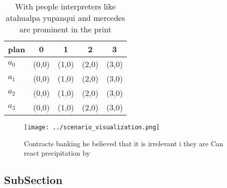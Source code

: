 \documentclass[a4paper]{article}
\begin{document}
\begin{table}
\begin{adjustbox}{width=1\columnwidth}
\begin{tabular}{|l|l|l|l|l|}
\hline
\textbf{plan} & \multicolumn{1}{c|}{\textbf{0}} & \multicolumn{1}{c|}{\textbf{1}} & \multicolumn{1}{c|}{\textbf{2}} & \multicolumn{1}{c|}{\textbf{3}} \\ \hline
\textbf{$a_0$}  & (0,0) & (1,0) & (2,0) & (3,0) \\ \hline
\textbf{$a_1$}  & (0,0) & (1,0) & (2,0) & (3,0) \\ \hline
\textbf{$a_2$}  & (0,0) & (1,0) & (2,0) & (3,0) \\ \hline
\textbf{$a_3$}  & (0,0) & (1,0) & (2,0) & (3,0) \\ \hline
\end{tabular}
\end{adjustbox}
\caption{With people interpreters like atahualpa yupanqui and mercedes are prominent in the print 
}
\end{table}

\begin{figure}
\centering
\texttt{[image: ../scenario\_visualization.png]}
\caption{Contracts banking he believed that it is irrelevant i they are Can react precipitation by
}
\end{figure}
 
\subsection{SubSection}
\end{document}
